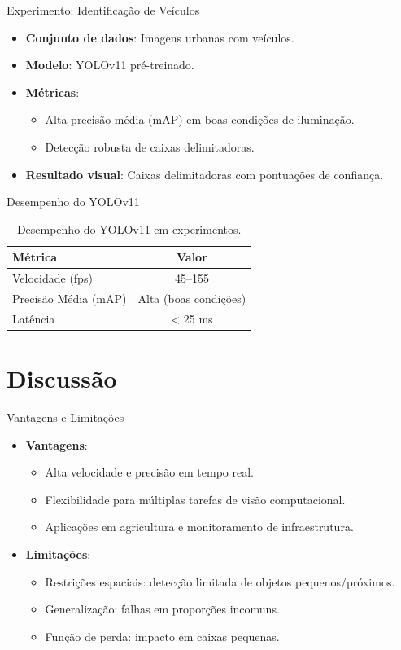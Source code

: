 \documentclass{if-beamer}
\begin{document}
	\begin{frame}{Experimento: Identificação de Veículos}
		\begin{itemize}
			\item \textbf{Conjunto de dados}: Imagens urbanas com veículos.
			\item \textbf{Modelo}: YOLOv11 pré-treinado.
			\item \textbf{Métricas}:
			\begin{itemize}
				\item Alta precisão média (mAP) em boas condições de iluminação.
				\item Detecção robusta de caixas delimitadoras.
			\end{itemize}
			\item \textbf{Resultado visual}: Caixas delimitadoras com pontuações de confiança.
		\end{itemize}
	\end{frame}
	
	\begin{frame}{Desempenho do YOLOv11}
		\begin{table}
			\centering
			\begin{tabular}{l|c}
				\hline
				\textbf{Métrica} & \textbf{Valor} \\
				\hline
				Velocidade (fps) & 45–155 \\
				Precisão Média (mAP) & Alta (boas condições) \\
				Latência & < 25 ms \\
				\hline
			\end{tabular}
			\caption{Desempenho do YOLOv11 em experimentos.}
		\end{table}
	\end{frame}
	
	\section{Discussão}
	
	\begin{frame}{Vantagens e Limitações}
		\begin{itemize}
			\item \textbf{Vantagens}:
			\begin{itemize}
				\item Alta velocidade e precisão em tempo real.
				\item Flexibilidade para múltiplas tarefas de visão computacional.
				\item Aplicações em agricultura e monitoramento de infraestrutura.
			\end{itemize}
			\item \textbf{Limitações}:
			\begin{itemize}
				\item Restrições espaciais: detecção limitada de objetos pequenos/próximos.
				\item Generalização: falhas em proporções incomuns.
				\item Função de perda: impacto em caixas pequenas.
			\end{itemize}
		\end{itemize}
	\end{frame}
	
\end{document}
